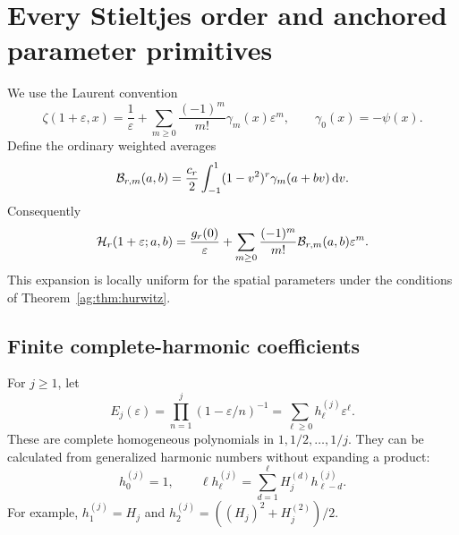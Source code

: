 \section{Every Stieltjes order and anchored parameter primitives}
\label{ag:sec:stieltjes}

We use the Laurent convention
\begin{equation}\label{ag:eq:Stieltjes-convention}
 \zeta(1+\varepsilon,x)=\frac1\varepsilon+
       \sum_{m\ge0}\frac{(-1)^m}{m!}\gamma_m(x)\varepsilon^m,
                 \qquad \gamma_0(x)=-\psi(x).
\end{equation}
Define the ordinary weighted averages
\begin{equation}\label{ag:eq:Bdefinition}
 \mathcal B_{r,m}(a,b)=\frac{c_r}{2}\int_{-1}^1
                      (1-v^2)^r\gamma_m(a+bv)\,\mathrm d v.
\end{equation}
Consequently
\[
 \mathcal H_r(1+\varepsilon;a,b)=\frac{g_r(0)}\varepsilon+
              \sum_{m\ge0}\frac{(-1)^m}{m!}\mathcal B_{r,m}(a,b)\varepsilon^m.
\]
This expansion is locally uniform for the spatial parameters under the
conditions of Theorem~\ref{ag:thm:hurwitz}.

\subsection{Finite complete-harmonic coefficients}
For $j\ge1$, let
\begin{equation}\label{ag:eq:homogeneous}
 E_j(\varepsilon)=\prod_{n=1}^j(1-\varepsilon/n)^{-1}
               =\sum_{\ell\ge0}h_\ell^{(j)}\varepsilon^\ell.
\end{equation}
These are complete homogeneous polynomials in $1,1/2,\ldots,1/j$.
They can be calculated from generalized harmonic numbers without
expanding a product:
\begin{equation}\label{ag:eq:hrecurrence}
 h_0^{(j)}=1,\qquad
 \ell h_\ell^{(j)}=\sum_{d=1}^\ell H_j^{(d)}h_{\ell-d}^{(j)}.
\end{equation}
For example, $h_1^{(j)}=H_j$ and
$h_2^{(j)}=((H_j)^2+H_j^{(2)})/2$.

